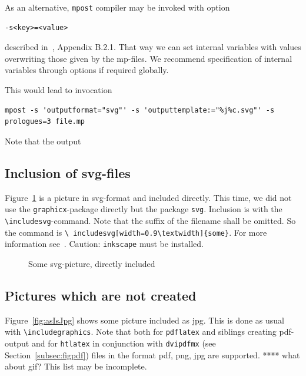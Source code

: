 \documentclass[12pt]{article}
\begin{document}
As an alternative, {\tt mpost} compiler may be invoked with option 
%
\begin{verbatim}
-s<key>=<value>
\end{verbatim}
%
described in~\cite{MPost}, Appendix B.2.1. 
That way we can set internal variables with values 
overwriting those given by the mp-files. 
We recommend specification of internal variables through options 
if required globally. 

This would lead to invocation 
%
\begin{Verbatim}[fontsize=\scriptsize]
mpost -s 'outputformat="svg"' -s 'outputtemplate:="%j%c.svg"' -s prologues=3 file.mp
\end{Verbatim}

Note that the output 

\subsection{Inclusion of svg-files}\label{subsec:picSvg}

Figure~\ref{fig:asIsSvg} is a picture in \gls{svg}-format 
and included directly. 
This time, we did not use the {\tt graphicx}-package directly 
but the package {\tt svg}. 
Inclusion is with the {\tt\textbackslash includesvg}-command. 
Note that the suffix of the filename shall be omitted. 
So the command is {\tt \textbackslash
includesvg[width=0.9\textbackslash textwidth]\{some\}}. 
For more information see~\cite{SvgP}. 
Caution: {\tt inkscape} must be installed. 

\begin{figure}[htb]
\begin{center}
%
\end{center}
\caption{\label{fig:asIsSvg}Some svg-picture, directly included }
\end{figure}



\subsection{Pictures which are not created}\label{subsec:picasis}

Figure~\ref{fig:asIsJpg} shows some picture included as jpg. 
This is done as usual with {\tt\textbackslash includegraphics}. 
Note that both for {\tt pdflatex} and siblings creating pdf-output 
and for {\tt htlatex} in conjunction with {\tt dvipdfmx} 
(see Section~\ref{subsec:figpdf}) 
files in the format pdf, \gls{png}, \gls{jpg} are supported. 
 **** what about \gls{gif}? 
This list may be incomplete. 
\end{document}
